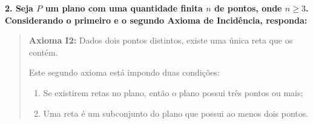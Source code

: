 \documentclass[12pt,a4paper]{article}
\begin{document}
\vspace{0.8cm}

\textbf{2. Seja $P$ um plano com uma quantidade finita $n$ de pontos, onde $n \geq 3$. Considerando o primeiro e o segundo Axioma de Incidência, responda:}

\vspace{0.4cm}

\begin{quote}
\textbf{Axioma I2:} Dados dois pontos distintos, existe uma única reta que os contém.

Este segundo axioma está impondo duas condições:
\begin{enumerate}[label=(\roman*)]
    \item Se existirem retas no plano, então o plano possui três pontos ou mais;
    \item Uma reta é um subconjunto do plano que possui ao menos dois pontos.
\end{enumerate}
\end{quote}

\vspace{0.4cm}
\end{document}
